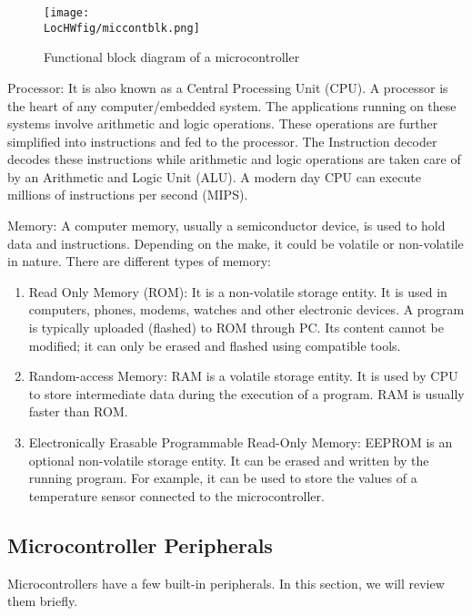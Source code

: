 \begin{figure}
  \centering
  \texttt{[image: \\LocHWfig/miccontblk.png]}
  \caption{Functional block diagram of a microcontroller}
  \label{micro-arch}
\end{figure}

\begin{description}
  \item {Processor:} It is also known as a Central Processing Unit
        (CPU).  A processor is the heart of any computer/embedded
        system. The applications running on these systems involve arithmetic
        and logic operations. These operations are further simplified into
        instructions and fed to the processor.  The Instruction decoder
        decodes these instructions while arithmetic and logic operations are
        taken care of by an Arithmetic and Logic Unit (ALU). A modern day
        CPU can execute millions of instructions per second (MIPS).

  \item {Memory:}
        A computer memory, usually a semiconductor device, is used to hold data and instructions. Depending on the make, it could be volatile or non-volatile in nature. There are different types of memory:
        \begin{enumerate}
          \item Read Only Memory (ROM): It is a non-volatile storage entity. It
                is used in computers, phones, modems, watches and other electronic
                devices. A program is typically uploaded (flashed) to ROM through PC.
                Its content cannot be modified; it can only be erased and flashed
                using compatible tools.
          \item Random-access Memory: RAM is a volatile storage entity. It is
                used by CPU to store intermediate data during the execution of a
                program. RAM is usually faster than ROM.
          \item Electronically Erasable Programmable Read-Only Memory: EEPROM is
                an optional non-volatile storage entity. It can be erased and
                written by the running program.  For example, it can be used to
                store the values of a temperature sensor connected to the microcontroller.
        \end{enumerate}
\end{description}

\subsection{Microcontroller Peripherals}
Microcontrollers have a few built-in peripherals.  In this section, we
will review them briefly.

